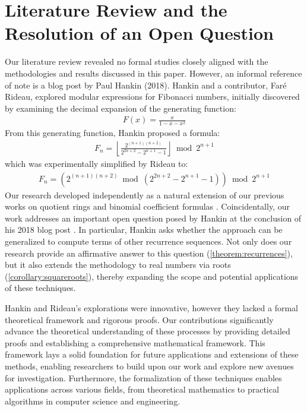 \documentclass[11pt,reqno]{article}
\theoremstyle{plain}
\theoremstyle{definition}
\newcommand{\floor}[1]{\left\lfloor #1 \right\rfloor}
\begin{document}
\section{Literature Review and the Resolution of an Open Question} \label{section:litreview}
Our literature review revealed no formal studies closely aligned with the methodologies and results discussed in this paper. However, an informal reference of note is a blog post by Paul Hankin \cite{hankin2018fibonacci2} (2018). Hankin and a contributor, Faré Rideau, explored modular expressions for Fibonacci numbers, initially discovered by examining the decimal expansion of the generating function:
\begin{align*}
F(x) = \frac{x}{1-x-x^2}
\end{align*}
From this generating function, Hankin proposed a formula:
\begin{align*}
F_n = \floor{\frac{2^{(n+1)(n+2)}}{2^{2n+2} - 2^{n+1} - 1}} \bmod{2^{n+1}}
\end{align*}
which was experimentally simplified by Rideau to:
\begin{align*}
F_n = \left( 2^{(n+1)(n+2)} \bmod{(2^{2n+2} - 2^{n+1} - 1)} \right) \bmod{2^{n+1}}
\end{align*}
Our research developed independently as a natural extension of our previous works on quotient rings \cite{shunia2023polynomial} and binomial coefficient formulas \cite{shunia2023simple}. Coincidentally, our work addresses an important open question posed by Hankin at the conclusion of his 2018 blog post \cite{hankin2018fibonacci2}. In particular, Hankin asks whether the approach can be generalized to compute terms of other recurrence sequences. Not only does our research provide an affirmative answer to this question (\cref{theorem:recurrences}), but it also extends the methodology to real numbers via roots (\cref{corollary:squareroots}), thereby expanding the scope and potential applications of these techniques.

Hankin and Rideau's explorations were innovative, however they lacked a formal theoretical framework and rigorous proofs. Our contributions significantly advance the theoretical understanding of these processes by providing detailed proofs and establishing a comprehensive mathematical framework. This framework lays a solid foundation for future applications and extensions of these methods, enabling researchers to build upon our work and explore new avenues for investigation. Furthermore, the formalization of these techniques enables applications across various fields, from theoretical mathematics to practical algorithms in computer science and engineering.
\end{document}
